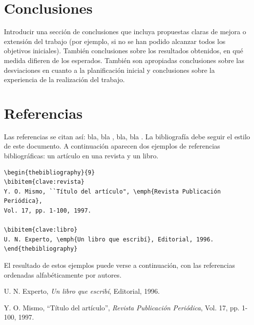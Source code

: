 \documentclass{pid}
\begin{document}
\section{Conclusiones}
Introducir una sección de conclusiones que incluya propuestas claras de mejora o extensión del trabajo (por ejemplo, si no se han podido alcanzar todos los objetivos iniciales). También conclusiones sobre los resultados obtenidos, en qué medida difieren de los esperados. También son apropiadas conclusiones sobre las desviaciones en cuanto a la planificación inicial y conclusiones sobre la experiencia de la realización del trabajo.


\section{Referencias}

Las referencias se citan así:
bla, bla \cite{clave:revista}, bla, bla \cite{clave:libro}. La bibliografía
debe seguir el estilo de este documento. A continuación aparecen dos ejemplos de referencias bibliográficas: un artículo en una revista y un libro.

\begin{verbatim}
\begin{thebibliography}{9}
\bibitem{clave:revista}
Y. O. Mismo, ``Título del artículo", \emph{Revista Publicación Periódica},
Vol. 17, pp. 1-100, 1997.

\bibitem{clave:libro}
U. N. Experto, \emph{Un libro que escribí}, Editorial, 1996.
\end{thebibliography}
\end{verbatim}

El resultado de estos ejemplos puede verse a continuación, con las referencias ordenadas alfabéticamente por autores.



\begin{thebibliography}{10}
U. N. Experto, \emph{Un libro que escribí},
Editorial, 1996.

Y. O. Mismo,
``Título del artículo'',
\emph{Revista Publicación Periódica}, Vol. 17, pp. 1-100, 1997.



\end{thebibliography}
\newpage
{}
\end{document}
